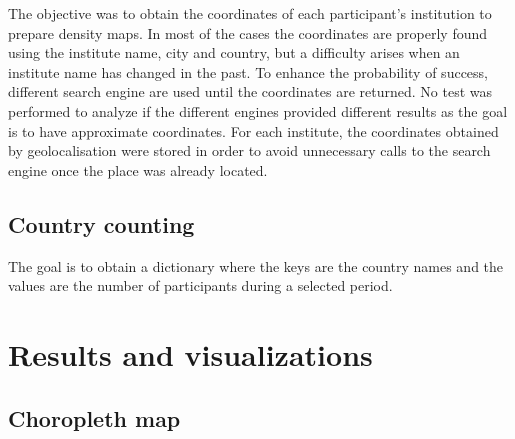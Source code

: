 \documentclass[12pt,a4paper,oneside,final]{article}
\begin{document}
The objective was to obtain the coordinates of each participant's institution to prepare density maps. In most of the cases the coordinates are properly found using the institute name, city and country, but a difficulty arises when an institute name has changed in the past. To enhance the probability of success, different search engine are used until the coordinates are returned. No test was performed to analyze if the different engines provided different results as the goal is to have approximate coordinates. For each institute, the coordinates obtained by geolocalisation were stored in order to avoid unnecessary calls to the search engine once the place was already located.

\subsection{Country counting}

The goal is to obtain a dictionary where the keys are the country names and the values are the number of participants during a selected period.


\section{Results and visualizations}

\subsection{Choropleth map}
\end{document}
